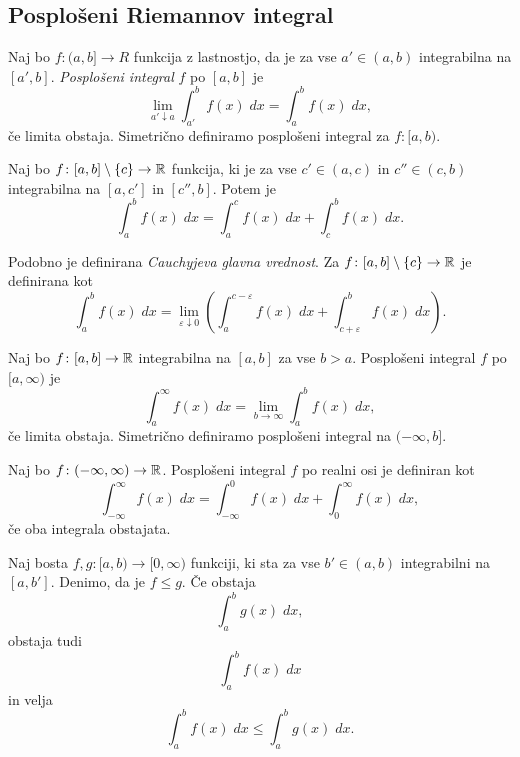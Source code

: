 \documentclass[12pt, a4paper]{article}
\begin{document}
\subsection{Posplošeni Riemannov integral}

\begin{definicija}
Naj bo $f\colon(a,b]\to R$ funkcija z lastnostjo, da je za vse $a'\in(a,b)$ integrabilna na $[a',b]$. \emph{Posplošeni integral} $f$ po $[a,b]$ je
\[
\lim_{a'\downarrow a}\int_{a'}^b f(x)\;dx=\int_a^b f(x)\;dx,
\]
če limita obstaja. Simetrično definiramo posplošeni integral za $f\colon[a,b)$.
\end{definicija}

\begin{definicija}
Naj bo $f\colon[a,b]\setminus\left\{c\right\}\to\mathbb{R}$ funkcija, ki je za vse $c'\in(a,c)$ in $c''\in(c,b)$ integrabilna na $[a,c']$ in $[c'',b]$. Potem je
\[
\int_a^b f(x)\;dx=\int_a^c f(x)\;dx+\int_c^b f(x)\;dx.
\]
\end{definicija}

\begin{opomba}
Podobno je definirana \emph{Cauchyjeva glavna vrednost}. Za $f\colon[a,b]\setminus\left\{c\right\}\to\mathbb{R}$ je definirana kot
\[
\int_a^b f(x)\;dx=\lim_{\varepsilon\downarrow 0}\left(\int_a^{c-\varepsilon} f(x)\;dx + \int_{c+\varepsilon}^b f(x)\;dx\right).
\]
\end{opomba}

\begin{definicija}
Naj bo $f\colon[a,b]\to\mathbb{R}$ integrabilna na $[a,b]$ za vse $b>a$. Posplošeni integral $f$ po $[a,\infty)$ je
\[
\int_a^\infty f(x)\;dx=\lim_{b\to\infty}\int_a^b f(x)\;dx,
\]
če limita obstaja. Simetrično definiramo posplošeni integral na $(-\infty, b]$.
\end{definicija}

\begin{definicija}
Naj bo $f\colon(-\infty,\infty)\to\mathbb{R}$. Posplošeni integral $f$ po realni osi je definiran kot
\[
\int_{-\infty}^\infty f(x)\;dx=\int_{-\infty}^0 f(x)\;dx+\int_0^\infty f(x)\;dx,
\]
če oba integrala obstajata.
\end{definicija}

\begin{trditev}
Naj bosta $f,g\colon[a,b)\to[0,\infty)$ funkciji, ki sta za vse $b'\in(a,b)$ integrabilni na $[a,b']$. Denimo, da je $f\leq g$. Če obstaja
\[
\int_a^b g(x)\;dx,
\]
obstaja tudi
\[
\int_a^b f(x)\;dx
\]
in velja
\[
\int_a^b f(x)\;dx\leq \int_a^b g(x)\;dx.
\]
\end{trditev}
\end{document}
